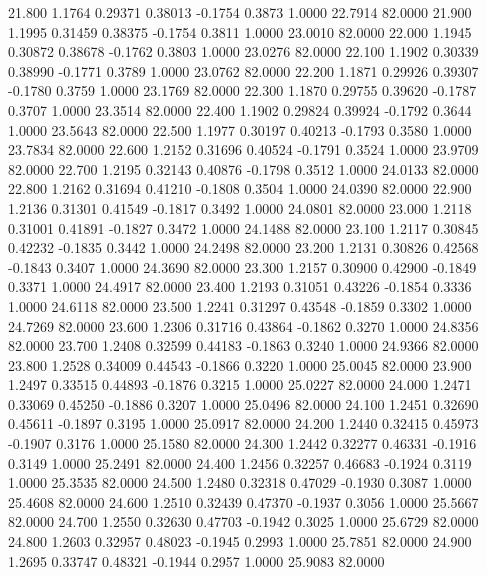   21.800   1.1764   0.29371   0.38013  -0.1754   0.3873   1.0000  22.7914  82.0000
  21.900   1.1995   0.31459   0.38375  -0.1754   0.3811   1.0000  23.0010  82.0000
  22.000   1.1945   0.30872   0.38678  -0.1762   0.3803   1.0000  23.0276  82.0000
  22.100   1.1902   0.30339   0.38990  -0.1771   0.3789   1.0000  23.0762  82.0000
  22.200   1.1871   0.29926   0.39307  -0.1780   0.3759   1.0000  23.1769  82.0000
  22.300   1.1870   0.29755   0.39620  -0.1787   0.3707   1.0000  23.3514  82.0000
  22.400   1.1902   0.29824   0.39924  -0.1792   0.3644   1.0000  23.5643  82.0000
  22.500   1.1977   0.30197   0.40213  -0.1793   0.3580   1.0000  23.7834  82.0000
  22.600   1.2152   0.31696   0.40524  -0.1791   0.3524   1.0000  23.9709  82.0000
  22.700   1.2195   0.32143   0.40876  -0.1798   0.3512   1.0000  24.0133  82.0000
  22.800   1.2162   0.31694   0.41210  -0.1808   0.3504   1.0000  24.0390  82.0000
  22.900   1.2136   0.31301   0.41549  -0.1817   0.3492   1.0000  24.0801  82.0000
  23.000   1.2118   0.31001   0.41891  -0.1827   0.3472   1.0000  24.1488  82.0000
  23.100   1.2117   0.30845   0.42232  -0.1835   0.3442   1.0000  24.2498  82.0000
  23.200   1.2131   0.30826   0.42568  -0.1843   0.3407   1.0000  24.3690  82.0000
  23.300   1.2157   0.30900   0.42900  -0.1849   0.3371   1.0000  24.4917  82.0000
  23.400   1.2193   0.31051   0.43226  -0.1854   0.3336   1.0000  24.6118  82.0000
  23.500   1.2241   0.31297   0.43548  -0.1859   0.3302   1.0000  24.7269  82.0000
  23.600   1.2306   0.31716   0.43864  -0.1862   0.3270   1.0000  24.8356  82.0000
  23.700   1.2408   0.32599   0.44183  -0.1863   0.3240   1.0000  24.9366  82.0000
  23.800   1.2528   0.34009   0.44543  -0.1866   0.3220   1.0000  25.0045  82.0000
  23.900   1.2497   0.33515   0.44893  -0.1876   0.3215   1.0000  25.0227  82.0000
  24.000   1.2471   0.33069   0.45250  -0.1886   0.3207   1.0000  25.0496  82.0000
  24.100   1.2451   0.32690   0.45611  -0.1897   0.3195   1.0000  25.0917  82.0000
  24.200   1.2440   0.32415   0.45973  -0.1907   0.3176   1.0000  25.1580  82.0000
  24.300   1.2442   0.32277   0.46331  -0.1916   0.3149   1.0000  25.2491  82.0000
  24.400   1.2456   0.32257   0.46683  -0.1924   0.3119   1.0000  25.3535  82.0000
  24.500   1.2480   0.32318   0.47029  -0.1930   0.3087   1.0000  25.4608  82.0000
  24.600   1.2510   0.32439   0.47370  -0.1937   0.3056   1.0000  25.5667  82.0000
  24.700   1.2550   0.32630   0.47703  -0.1942   0.3025   1.0000  25.6729  82.0000
  24.800   1.2603   0.32957   0.48023  -0.1945   0.2993   1.0000  25.7851  82.0000
  24.900   1.2695   0.33747   0.48321  -0.1944   0.2957   1.0000  25.9083  82.0000
